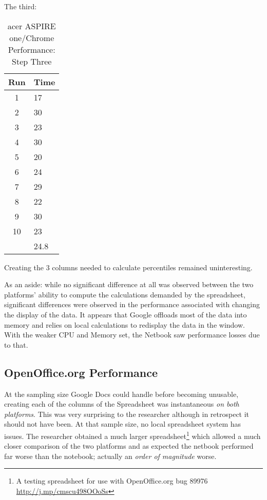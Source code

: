 The third:

\begin{table}
  \begin{tabular}{| c | l |}
    \hline
    Run  & Time \\ \hline
    1    & 17   \\ \hline
    2    & 30   \\ \hline
    3    & 23   \\ \hline
    4    & 30   \\ \hline
    5    & 20   \\ \hline
    6    & 24   \\ \hline
    7    & 29   \\ \hline
    8    & 22   \\ \hline
    9    & 30   \\ \hline
    10   & 23   \\ \hline
    & 24.8 \\
    \hline
  \end{tabular}
  \caption{acer ASPIRE one/Chrome Performance: Step Three}
  \label{aspChrPerf03}
\end{table}

Creating the 3 columns needed to calculate percentiles remained uninteresting.

As an aside: while no significant difference at all was observed between the
two platforms' ability to compute the calculations demanded by the spreadsheet,
significant differences were observed in the performance associated with
changing the display of the data.  It appears that Google offloads most of the
data into memory and relies on local calculations to redisplay the data in the
window.  With the weaker CPU and Memory set, the Netbook saw performance losses
due to that.

\subsection{OpenOffice.org Performance}

At the sampling size Google Docs could handle before becoming unusable, creating
each of the columns of the Spreadsheet was instantaneous \emph{on both
  platforms}.  This was very surprising to the researcher although in retrospect
it should not have been.  At that sample size, no local spreadsheet system has
issues.  The researcher obtained a much larger spreadsheet\footnote{A testing
  spreadsheet for use with OpenOffice.org bug 89976
  \url{http://j.mp/cmscu498OOoSs}} which allowed a much closer comparison of the
two platforms and as expected the netbook performed far worse than the notebook;
actually an \emph{order of magnitude} worse.

